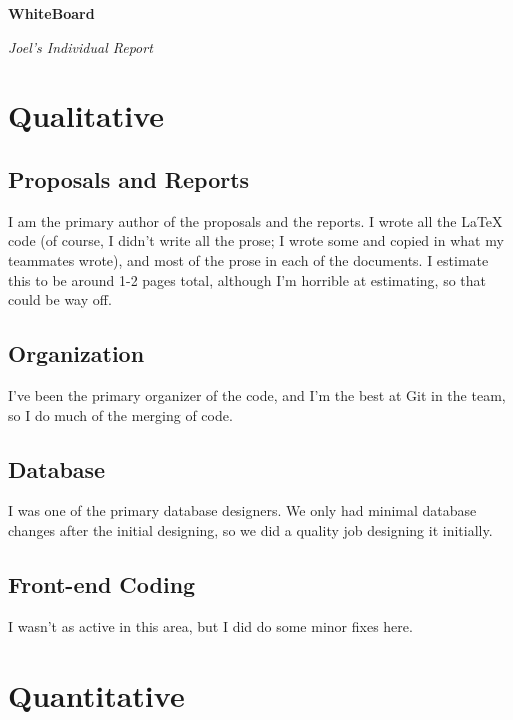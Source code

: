 \documentclass[12 pt]{article}
\begin{document}
\begin{center}

    \huge{\textbf{WhiteBoard}}

    \huge{\textit{Joel's Individual Report}}

\end{center}

\vspace{10 pt}

\section{Qualitative}

\subsection{Proposals and Reports}

I am the primary author of the proposals and the reports. I wrote all the LaTeX
code (of course, I didn't write all the prose; I wrote some and copied in what
my teammates wrote), and most of the prose in each of the documents. I estimate
this to be around 1-2 pages total, although I'm horrible at estimating, so that
could be way off.

\subsection{Organization}

I've been the primary organizer of the code, and I'm the best at Git in the
team, so I do much of the merging of code.

\subsection{Database}

I was one of the primary database designers. We only had minimal database
changes after the initial designing, so we did a quality job designing it
initially.

\subsection{Front-end Coding}

I wasn't as active in this area, but I did do some minor fixes here.

\section{Quantitative}
\end{document}
